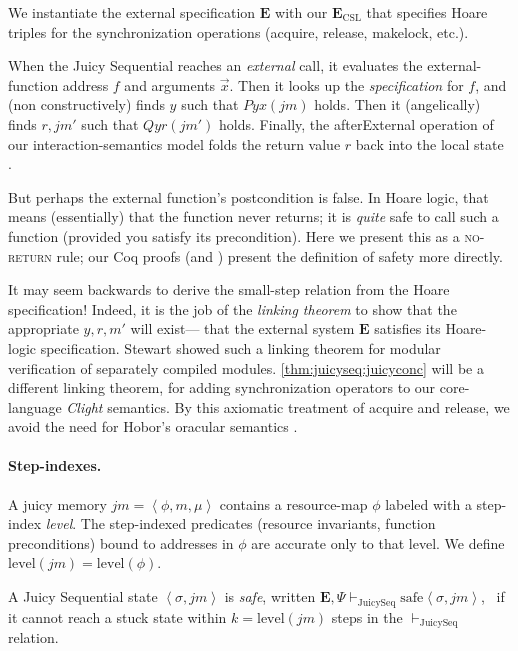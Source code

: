 We instantiate the external specification $\mathbf{E}$ with our
$\mathbf{E}_\mathrm{CSL}$ that specifies 
Hoare triples for 
the synchronization operations
(acquire, release, makelock, etc.).

When the Juicy Sequential reaches an \emph{external} call, it
evaluates
the external-function address $f$ and arguments $\vec{x}$.  Then it
looks up the \emph{specification} for $f$, and (non constructively)
finds $y$ such that $Pyx (\mathit{jm})$ holds.  Then it
(angelically) finds $r, \mathit{jm}'$ such that
$Qyr (\mathit{jm}')$
holds.  Finally,
the afterExternal operation of our interaction-semantics model
folds the return value $r$ back into the local state \cite{bsda:esop2014}.

But perhaps the external function's postcondition
is false.  In Hoare logic, that means (essentially) that the function
never returns; it is \emph{quite} safe to call such a function
(provided you satisfy its precondition).
Here we present this as a \textsc{no-return} rule;
our Coq proofs (and \cite[pages 119--120]{stewart15:phd})
present the definition of safety more directly.

It may seem backwards to derive the small-step relation from
the Hoare specification!
Indeed, it is the job of the \emph{linking theorem} to
show that the appropriate $y,r, m'$ will exist---
that the external system
$\mathbf{E}$ satisfies its Hoare-logic specification.
Stewart \cite[Thm. 9]{stewart15:phd} showed such a
linking theorem for modular verification of separately compiled modules.
\autoref{thm:juicyseq:juicyconc} will be
a different linking theorem, for
adding synchronization operators to our core-language \emph{Clight} semantics.
By this axiomatic treatment of 
acquire and release, we avoid
the need for Hobor's oracular semantics \cite{hobor08:esop}.

\paragraph{Step-indexes.}
A juicy memory $\mathit{jm}=\left<\phi,m,\mu\right>$
contains a resource-map $\phi$ labeled with a
step-index \emph{level}.
The step-indexed predicates 
(resource invariants, function preconditions)
bound to addresses in $\phi$  are
accurate only to that level.
We define $\mathrm{level}(\mathit{jm})=\mathrm{level}(\phi)$.

\begin{definition}
\label{def:seqsafe}
A Juicy Sequential state $\left<\sigma,\mathit{jm}\right>$ is \emph{safe},
written \linebreak
 $\mathbf{E}, \Psi \vdash_\mathrm{JuicySeq} \mathrm{safe}\left<\sigma,\mathit{jm}\right>$,
\ if it cannot reach a stuck state within $k=\mathrm{level}(\mathit{jm})$ steps
in the $\vdash_\mathrm{JuicySeq}$ relation.  \cite[page 393]{appel14:plcc}
\end{definition}

